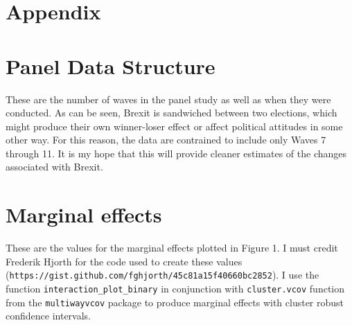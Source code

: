 \documentclass[12pt, letter]{article}
\begin{document}
\singlespacing
\appendix

\section*{Appendix}

\section{Panel Data Structure}

These are the number of waves in the panel study as well as when they were conducted. As can be seen, Brexit is sandwiched between two elections, which might produce their own winner-loser effect or affect political attitudes in some other way. For this reason, the data are contrained to include only Waves 7 through 11. It is my hope that this will provide cleaner estimates of the changes associated with Brexit.

\begin{center}
\end{center}

\section{Marginal effects}

These are the values for the marginal effects plotted in Figure 1. I must credit Frederik Hjorth for the code used to create these values (\texttt{https://gist.github.com/fghjorth/45c81a15f40660bc2852}). I use the function \texttt{interaction\_plot\_binary} in conjunction with \texttt{cluster.vcov} function from the \texttt{multiwayvcov} package to produce marginal effects with cluster robust confidence intervals.
\end{document}
